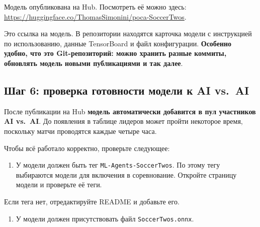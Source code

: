 \documentclass[11pt,a4paper]{article}
\begin{document}
Модель опубликована на Hub. Посмотреть её можно здесь: \url{https://huggingface.co/ThomasSimonini/poca-SoccerTwos}.

Это ссылка на модель. В репозитории находятся карточка модели с инструкцией по использованию, данные TensorBoard и файл конфигурации. \textbf{Особенно удобно, что это Git-репозиторий: можно хранить разные коммиты, обновлять модель новыми публикациями и так далее}.

\subsection{Шаг 6: проверка готовности модели к AI vs.~AI}\label{step-6-verify-that-your-model-is-ready-for-ai-vs-ai-challenge}

После публикации на Hub \textbf{модель автоматически добавится в пул участников AI vs.~AI}. До появления в таблице лидеров может пройти некоторое время, поскольку матчи проводятся каждые четыре часа.

Чтобы всё работало корректно, проверьте следующее:

\begin{enumerate}
\def\labelenumi{\arabic{enumi}.}
\tightlist
\item
  У модели должен быть тег \texttt{ML-Agents-SoccerTwos}. По этому тегу выбираются модели для включения в соревнование. Откройте страницу модели и проверьте её теги.
\end{enumerate}


Если тега нет, отредактируйте README и добавьте его.


\begin{enumerate}
\def\labelenumi{\arabic{enumi}.}
\setcounter{enumi}{1}
\tightlist
\item
  У модели должен присутствовать файл \texttt{SoccerTwos.onnx}.
\end{enumerate}

\end{document}
